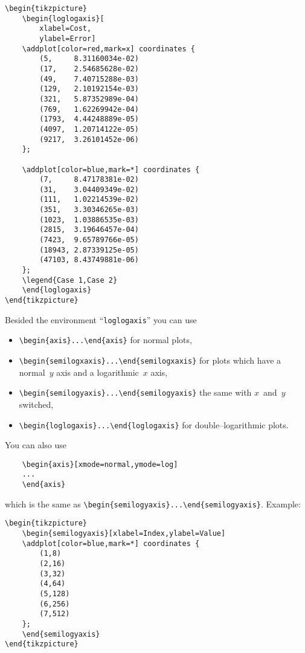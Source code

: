 \begin{lstlisting}
\begin{tikzpicture}
	\begin{loglogaxis}[
		xlabel=Cost,
		ylabel=Error]
	\addplot[color=red,mark=x] coordinates {
		(5,		8.31160034e-02)
		(17,	2.54685628e-02)
		(49,	7.40715288e-03)
		(129,	2.10192154e-03)
		(321,	5.87352989e-04)
		(769,	1.62269942e-04)
		(1793,	4.44248889e-05)
		(4097,	1.20714122e-05)
		(9217,	3.26101452e-06)
	};

	\addplot[color=blue,mark=*] coordinates {
		(7,		8.47178381e-02)
		(31,	3.04409349e-02)
		(111,	1.02214539e-02)
		(351,	3.30346265e-03)
		(1023,	1.03886535e-03)
		(2815,	3.19646457e-04)
		(7423,	9.65789766e-05)
		(18943,	2.87339125e-05)
		(47103,	8.43749881e-06)
	};
	\legend{Case 1,Case 2}
	\end{loglogaxis}
\end{tikzpicture}
\end{lstlisting}
Besided the environment ``\texttt{loglogaxis}'' you can use
\begin{itemize}
	\item \lstinline!\begin{axis}...\end{axis}! for normal plots,
	\item \lstinline!\begin{semilogxaxis}...\end{semilogxaxis}! for plots which have a normal~$y$ axis and a logarithmic~$x$ axis,
	\item \lstinline!\begin{semilogyaxis}...\end{semilogyaxis}! the same with $x$~and~$y$ switched,
	\item \lstinline!\begin{loglogaxis}...\end{loglogaxis}! for double--logarithmic plots.
\end{itemize}
You can also use
\begin{lstlisting}
	\begin{axis}[xmode=normal,ymode=log]
	...
	\end{axis}
\end{lstlisting}
which is the same as \lstinline!\begin{semilogyaxis}...\end{semilogyaxis}!. Example:
\begin{lstlisting}
\begin{tikzpicture}
	\begin{semilogyaxis}[xlabel=Index,ylabel=Value]
	\addplot[color=blue,mark=*] coordinates {
		(1,8)
		(2,16)
		(3,32)
		(4,64)
		(5,128)
		(6,256)
		(7,512)
	};
	\end{semilogyaxis}
\end{tikzpicture}
\end{lstlisting}
